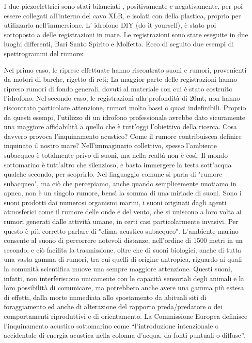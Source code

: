 
I due piezoelettrici sono stati bilanciati , positivamente e negativamente, per poi essere collegati all'interno del cavo XLR, e isolati con della plastica, proprio per utilizzarlo nell'immersione. L' idrofono DIY (do it yourself), è stato poi sottoposto a delle registrazioni in mare. Le registrazioni sono state eseguite in due luoghi differenti, Bari Santo Spirito e Molfetta. Ecco di seguito due esempi di spettrogrammi del rumore: 


Nel primo caso, le riprese effettuate hanno riscontrato suoni e rumori, provenienti da motori di barche, rigetto di reti; La maggior parte delle registrazioni hanno ripreso rumori di fondo generali, dovuti al materiale con cui è stato costruito l'idrofono. 
Nel secondo caso, le registrazioni alla profondità di 20mt, non hanno riscontrato particolare attenzione, rumori molto bassi o quasi indefinibili. 
Proprio da questi esempi, l'utilizzo di un idrofono professionale avrebbe dato sicuramente una maggiore affidabilità a quello che è tutt'oggi l'obiettivo della ricerca. Cosa davvero provoca l'inquinamento acustico? Come il rumore contribuiscea definire inquinato il nostro mare?
Nell'immaginario collettivo, spesso l'ambiente subacqueo è totalmente privo di suoni, ma nella realtà non è così. Il mondo sottomarino è tutt'altro che silenzioso, e basta immergere la testa sott'acqua qualche secondo, per scoprirlo.
Nel linguaggio comune si parla di "rumore subacqueo", ma ciò che percepiamo, anche quando semplicemente nuotiamo in apnea, non è un singolo rumore, bensì la somma di una miriade di suoni. Sono i suoni prodotti dai numerosi organismi marini, i suoni originati dagli agenti atmosferici come il rumore delle onde e del vento, che si uniscono a loro volta ai rumori generati dalle attività umane, in certi casi particolarmente invasivi.
Per questo è più corretto parlare di "clima acustico subacqueo". 
L’ambiente marino consente al suono di percorrere notevoli distanze, nell’ordine di 1500 metri in un secondo, e ciò facilita la trasmissione, oltre che di suoni biologici, anche di tutta una vasta gamma di rumori, tra cui quelli di origine antropica, riguardo ai quali la comunità scientifica muove una sempre maggiore attenzione. Questi suoni, infatti, non interferiscono unicamente con le capacità sensoriali degli animali e la loro possibilità di comunicare, ma potrebbero anche avere una gamma più estesa di effetti, dalla morte immediata allo spostamento da abituali siti di foraggiamento ed anche di alterazione del rapporto preda/predatore o dei comportamenti riproduttivi e di orientamento. 
La Commissione Europea definisce l’inquinamento acustico sottomarino come “l’introduzione intenzionale o accidentale di energia acustica nella colonna d’acqua, da fonti puntuali o diffuse”.


